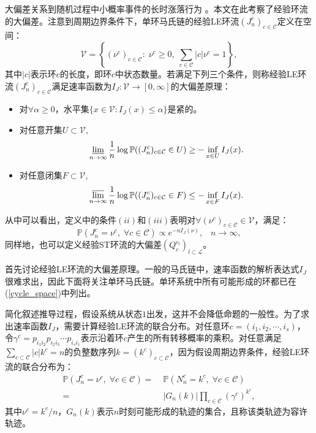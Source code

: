 大偏差关系到随机过程中小概率事件的长时涨落行为 \cite{varadhan1984large,den2000large}。本文在此考察了经验环流的大偏差。注意到周期边界条件下，单环马氏链的经验LE环流$(J_n^c)_{c \in \mathcal{C}}$定义在空间：
\begin{equation*}
    \mathcal{V} = \left\{(\nu^c)_{c\in \mathcal{C}}:\;\nu^c\geq 0,\;
    \sum_{c\in \mathcal{C}}|c|\nu^c  = 1\right\},
\end{equation*}
其中$|c|$表示环$c$的长度，即环$c$中状态数量。若满足下列三个条件\cite{varadhan1984large}，则称经验LE环流$(J_n^c)_{c \in \mathcal{C}}$满足速率函数为$I_J:\mathcal{V}\rightarrow [0,\infty]$的大偏差原理：
\begin{itemize}
    \item 对$\forall \alpha \geqslant 0$，水平集$\{x \in \mathcal{V}: I_{J}(x) \leqslant \alpha\}$是紧的。
    \item 对任意开集$U \subset \mathcal{V}$,
        \begin{equation}\label{def1}
            \varliminf_{n\to\infty}\frac{1}{n}\log\mathbb{P}((J^c_n)_{c\in\mathcal{C}}\in U)\ge-\inf_{x\in U}I_J(x).
        \end{equation}
    \item 对任意闭集$F \subset \mathcal{V}$,
        \begin{equation}\label{def2}
            \varlimsup_{n\to \infty}\frac{1}{n}\log\mathbb{P}((J^c_n)_{c\in\mathcal{C}}\in F)\le -\inf_{x\in F}I_J(x).
        \end{equation}
\end{itemize}
从中可以看出，定义中的条件$(ii)$和$(iii)$表明对$\forall (\nu^c)_{c\in\mathcal{C}}\in\mathcal{V}$，满足：
\begin{equation}\label{LDP}
    \mathbb{P}(J^c_n=\nu^c,\;\forall c\in\mathcal{C})\propto e^{-n I_J(\nu)},\;\;\;n\to\infty,
\end{equation}
同样地，也可以定义经验ST环流的大偏差$(Q_c^{c_l})_{l \subset \mathcal{L}}$。

首先讨论经验LE环流的大偏差原理。一般的马氏链中，速率函数的解析表达式$I_J$很难求出，因此下面将关注单环马氏链。单环系统中所有可能形成的环都已在 (\ref{cycle_space})中列出。

简化叙述推导过程，假设系统从状态$1$出发，这并不会降低命题的一般性。为了求出速率函数$I_J$，需要计算经验LE环流的联合分布。对任意环$c=(i_1, i_2, \cdots, i_s)$，令$\gamma^c = p_{i_1i_2}p_{i_2i_3}\cdots p_{i_si_1}$表示沿着环$c$产生的所有转移概率的乘积。对任意满足$\sum_{c \subset \mathcal{C}} |c| k^c=n$的负整数序列$k=(k^c)_{c\subset \mathcal{C}}$，因为假设周期边界条件，经验LE环流的联合分布为：
\begin{equation}\label{joint}
    \begin{split}
    \mathbb{P}\left(J^c_n=\nu^c,\;\forall c\in\mathcal{C}\right)
    =&\;\mathbb{P}\left(N^c_n=k^c,\;\forall c\in\mathcal{C}\right)\\
    =&\;|G_n(k)|\prod_{c\in\mathcal{C}}\left(\gamma^c\right)^{k^c},
    \end{split}
\end{equation}
其中$\nu^c = k^c/n$，$G_n(k)$表示$n$时刻可能形成的轨迹的集合，且称该类轨迹为容许轨迹。

